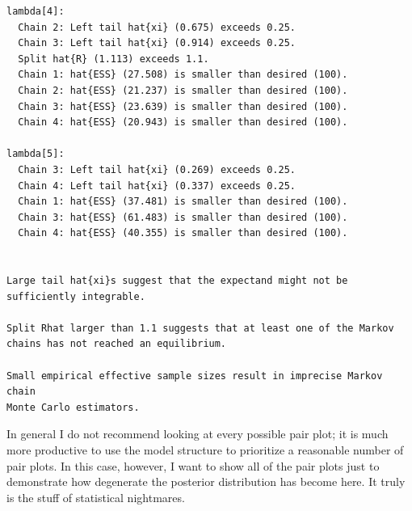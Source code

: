 \documentclass[
  letterpaper,
  DIV=11,
  numbers=noendperiod]{scrartcl}
\newenvironment{Shaded}{\begin{snugshade}}{\end{snugshade}}
\newcommand{\ControlFlowTok}[1]{\textcolor[rgb]{0.00,0.23,0.31}{#1}}
\newcommand{\DecValTok}[1]{\textcolor[rgb]{0.68,0.00,0.00}{#1}}
\newcommand{\FunctionTok}[1]{\textcolor[rgb]{0.28,0.35,0.67}{#1}}
\newcommand{\NormalTok}[1]{\textcolor[rgb]{0.00,0.23,0.31}{#1}}
\newcommand{\OtherTok}[1]{\textcolor[rgb]{0.00,0.23,0.31}{#1}}
\newcommand{\SpecialCharTok}[1]{\textcolor[rgb]{0.37,0.37,0.37}{#1}}
\newcommand{\StringTok}[1]{\textcolor[rgb]{0.13,0.47,0.30}{#1}}
\begin{document}
\begin{verbatim}
lambda[4]:
  Chain 2: Left tail hat{xi} (0.675) exceeds 0.25.
  Chain 3: Left tail hat{xi} (0.914) exceeds 0.25.
  Split hat{R} (1.113) exceeds 1.1.
  Chain 1: hat{ESS} (27.508) is smaller than desired (100).
  Chain 2: hat{ESS} (21.237) is smaller than desired (100).
  Chain 3: hat{ESS} (23.639) is smaller than desired (100).
  Chain 4: hat{ESS} (20.943) is smaller than desired (100).

lambda[5]:
  Chain 3: Left tail hat{xi} (0.269) exceeds 0.25.
  Chain 4: Left tail hat{xi} (0.337) exceeds 0.25.
  Chain 1: hat{ESS} (37.481) is smaller than desired (100).
  Chain 3: hat{ESS} (61.483) is smaller than desired (100).
  Chain 4: hat{ESS} (40.355) is smaller than desired (100).


Large tail hat{xi}s suggest that the expectand might not be
sufficiently integrable.

Split Rhat larger than 1.1 suggests that at least one of the Markov
chains has not reached an equilibrium.

Small empirical effective sample sizes result in imprecise Markov chain
Monte Carlo estimators.
\end{verbatim}

In general I do not recommend looking at every possible pair plot; it is
much more productive to use the model structure to prioritize a
reasonable number of pair plots. In this case, however, I want to show
all of the pair plots just to demonstrate how degenerate the posterior
distribution has become here. It truly is the stuff of statistical
nightmares.

\begin{Shaded}
\end{Shaded}
\end{document}
